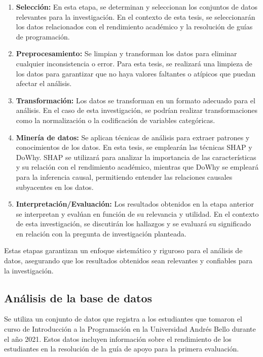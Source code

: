 \begin{enumerate}
  \item \textbf{Selección:} En esta etapa, se determinan y seleccionan los conjuntos de datos relevantes para la investigación. En el contexto de esta tesis, se seleccionarán los datos relacionados con el rendimiento académico y la resolución de guías de programación.
  
  \item \textbf{Preprocesamiento:} Se limpian y transforman los datos para eliminar cualquier inconsistencia o error. Para esta tesis, se realizará una limpieza de los datos para garantizar que no haya valores faltantes o atípicos que puedan afectar el análisis.
  
  \item \textbf{Transformación:} Los datos se transforman en un formato adecuado para el análisis. En el caso de esta investigación, se podrían realizar transformaciones como la normalización o la codificación de variables categóricas.
  
  \item \textbf{Minería de datos:} Se aplican técnicas de análisis para extraer patrones y conocimientos de los datos. En esta tesis, se emplearán las técnicas SHAP y DoWhy. SHAP se utilizará para analizar la importancia de las características y su relación con el rendimiento académico, mientras que DoWhy se empleará para la inferencia causal, permitiendo entender las relaciones causales subyacentes en los datos.
  
  \item \textbf{Interpretación/Evaluación:} Los resultados obtenidos en la etapa anterior se interpretan y evalúan en función de su relevancia y utilidad. En el contexto de esta investigación, se discutirán los hallazgos y se evaluará su significado en relación con la pregunta de investigación planteada.
\end{enumerate}

Estas etapas garantizan un enfoque sistemático y riguroso para el análisis de datos, asegurando que los resultados obtenidos sean relevantes y confiables para la investigación.


\subsection{Análisis de la base de datos}

Se utiliza un conjunto de datos que registra a los estudiantes que tomaron el curso de Introducción a la Programación en la Universidad Andrés Bello durante el año 2021. Estos datos incluyen información sobre el rendimiento de los estudiantes en la resolución de la guía de apoyo para la primera evaluación.

